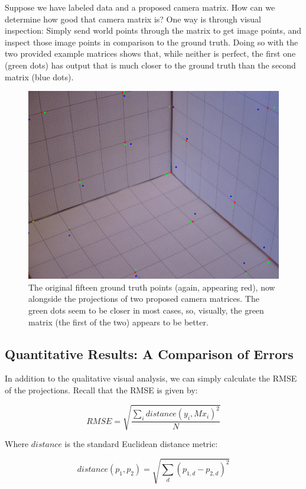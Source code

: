 \documentclass{article}
\begin{document}
Suppose we have labeled data and a proposed camera matrix. How can we determine 
how good that camera matrix is? One way is through visual inspection: Simply 
send world points through the matrix to get image points, and inspect those 
image points in comparison to the ground truth. Doing so with the two provided 
example matrices shows that, while neither is perfect, the first one (green 
dots) has output that is much closer to the 
ground truth than the second matrix (blue dots).

\begin{figure}[!ht]
	\centering
	\includegraphics[width=120mm]{figs/projected_points.png}
	\caption{The original fifteen ground truth points (again, appearing red), 
        now alongside the projections of two proposed camera matrices. The green 
        dots seem to be closer in most cases, so, visually, the green matrix 
        (the first of the two) appears to be better.}
\end{figure}

\subsection{Quantitative Results: A Comparison of Errors}

In addition to the qualitative visual analysis, we can simply calculate the 
RMSE of the projections. Recall that the RMSE is given by:

$$
RMSE = \sqrt{\frac{\sum_i distance(y_i, M x_i)^2}{N}}
$$

Where $distance$ is the standard Euclidean distance metric:

$$
distance(p_1, p_2) = \sqrt{\sum_d (p_{1, d} - p_{2, d})^2}
$$
\end{document}
